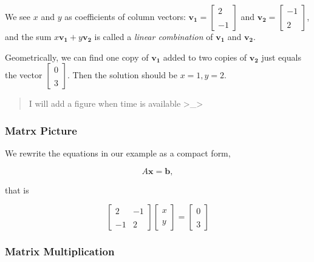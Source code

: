 \documentclass[]{article}
\begin{document}
We see \(x\) and \(y\) as coefficients of column vectors:
\(\boldsymbol{v_1} = \begin{bmatrix}2 \\\\ -1\end{bmatrix}\) and
\(\boldsymbol{v_2} = \begin{bmatrix}-1 \\\\ 2\end{bmatrix}\), and the
sum \(x\boldsymbol{v_1} + y\boldsymbol{v_2}\) is called a \emph{linear
combination} of \(\boldsymbol{v_1}\) and \(\boldsymbol{v_2}\).

Geometrically, we can find one copy of \(\boldsymbol{v_1}\) added to two
copies of \(\boldsymbol{v_2}\) just equals the vector
\(\begin{bmatrix}0 \\\\ 3\end{bmatrix}\). Then the solution should be
\(x = 1, y =2\).

\begin{quote}
I will add a figure when time is available
\textgreater{}\_\textgreater{}
\end{quote}

\hypertarget{matrx-picture}{%
\subsubsection{Matrx Picture}\label{matrx-picture}}

We rewrite the equations in our example as a compact form,

\[
A\boldsymbol{x} = \boldsymbol{b},
\]

that is

\[
\begin{bmatrix}2 & -1 \\\\ -1 & 2\end{bmatrix}\begin{bmatrix}x \\\\ y\end{bmatrix} = \begin{bmatrix}0 \\\\ 3\end{bmatrix}
\]

\hypertarget{matrix-multiplication}{%
\subsubsection{Matrix Multiplication}\label{matrix-multiplication}}
\end{document}
